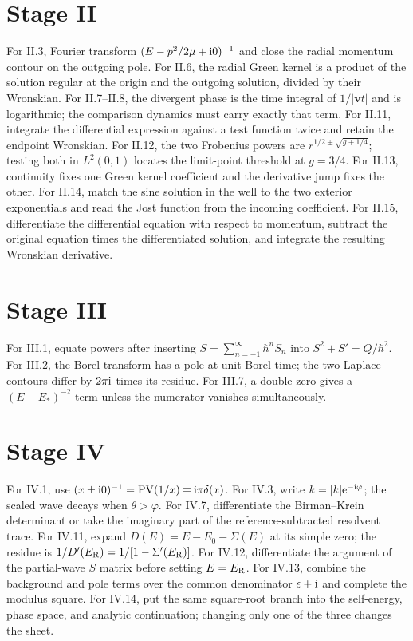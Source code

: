 \section*{Stage II}
For II.3, Fourier transform $(E-p^2/2\mu+\mathrm{i}0)^{-1}$ and close the radial
momentum contour on the outgoing pole.  For II.6, the radial Green kernel is a
product of the solution regular at the origin and the outgoing solution,
divided by their Wronskian.  For II.7--II.8, the divergent phase is the time
integral of $1/|\bm v t|$ and is logarithmic; the comparison dynamics must
carry exactly that term.
For II.11, integrate the differential expression against a test function
twice and retain the endpoint Wronskian.  For II.12, the two Frobenius powers
are $r^{1/2\pm\sqrt{g+1/4}}$; testing both in $L^2(0,1)$ locates the
limit-point threshold at $g=3/4$.  For II.13, continuity fixes one Green
kernel coefficient and the derivative jump fixes the other.  For II.14,
match the sine solution in the well to the two exterior exponentials and
read the Jost function from the incoming coefficient.  For II.15,
differentiate the differential equation with respect to momentum, subtract
the original equation times the differentiated solution, and integrate the
resulting Wronskian derivative.

\section*{Stage III}
For III.1, equate powers after inserting
$S=\sum_{n=-1}^{\infty}\hbar^nS_n$ into $S^2+S'=Q/\hbar^2$.
For III.2, the Borel transform has a pole at unit Borel time; the two Laplace
contours differ by $2\pi\mathrm{i}$ times its residue.  For III.7, a double zero
gives a $(E-E_*)^{-2}$ term unless the numerator vanishes simultaneously.

\section*{Stage IV}
For IV.1, use
$(x\pm\mathrm{i}0)^{-1}=\operatorname{PV}(1/x)\mp\mathrm{i}\pi\delta(x)$.
For IV.3, write $k=|k|\mathrm{e}^{-\mathrm{i}\varphi}$; the scaled wave decays when
$\theta>\varphi$.  For IV.7, differentiate the Birman--Krein determinant or
take the imaginary part of the reference-subtracted resolvent trace.
For IV.11, expand $D(E)=E-E_0-\Sigma(E)$ at its simple zero; the residue is
$1/D'(E_{\mathrm{R}})=1/[1-\Sigma'(E_{\mathrm{R}})]$.  For IV.12, differentiate the argument of
the partial-wave $S$ matrix before setting $E=E_{\mathrm{R}}$.  For IV.13, combine the
background and pole terms over the common denominator
$\epsilon+\mathrm{i}$ and complete the modulus square.  For IV.14, put the same
square-root branch into the self-energy, phase space, and analytic
continuation; changing only one of the three changes the sheet.


